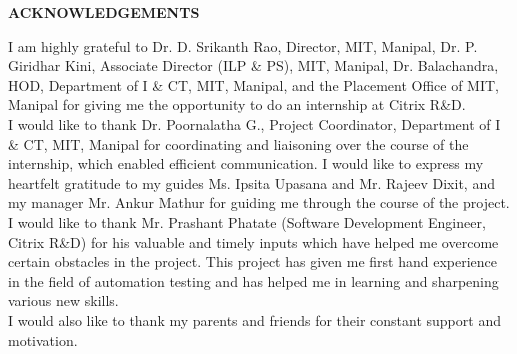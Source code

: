  \begin{center}
\large{\textbf{ACKNOWLEDGEMENTS}}\\
\vspace{1cm}
\end{center}
I am highly grateful to Dr. D. Srikanth Rao, Director, MIT, Manipal, Dr. P. Giridhar Kini, Associate Director (ILP \& PS), MIT, Manipal, Dr. Balachandra, HOD, Department of I  \& CT, MIT, Manipal, and the Placement Office of MIT, Manipal for giving me the opportunity to do an internship at Citrix R\&D.\\

I would like to thank Dr. Poornalatha G., Project Coordinator, Department of I  \& CT, MIT, Manipal for coordinating and liaisoning over the course of the internship, which enabled efficient communication. I would like to express my heartfelt gratitude to my guides Ms. Ipsita Upasana and Mr. Rajeev Dixit, and my manager Mr. Ankur Mathur for guiding me through the course of the project.  I would like to thank Mr. Prashant Phatate (Software Development Engineer, Citrix R\&D) for his valuable and timely inputs which have helped me overcome certain obstacles in the project. This project has given me first hand experience in the field of automation testing and has helped me in learning and sharpening various new skills.\\ 

I would also like to thank my parents and friends for their constant support and motivation.
